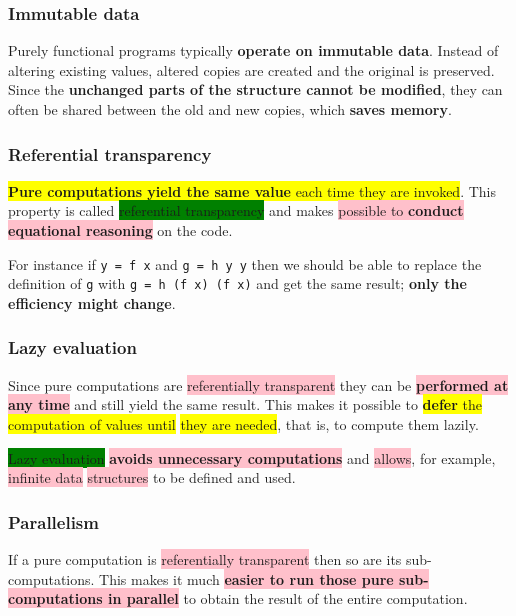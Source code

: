 \documentclass[tikz,border=10pt]{project_plan}
\begin{document}
\subsubsection{Immutable data}

Purely functional programs typically \textbf{operate on immutable data}. Instead
of altering existing values, altered copies are created and the original is
preserved. Since the \textbf{unchanged parts of the structure cannot be modified},
they can often be shared between the old and new copies, which \textbf{saves memory}.

\subsubsection{Referential transparency}

\colorbox{yellow}{\textbf{Pure computations yield the same value} each time they are invoked}. This
property is called \colorbox{green}{referential transparency} and makes \colorbox{pink}{possible to
  \textbf{conduct equational reasoning}} on the code.

For instance if \lstinline[]|y = f x| and \lstinline[]|g = h y y| then we should be able to replace the
definition of \lstinline[]|g| with \lstinline[]|g = h (f x) (f x)| and get the same result;
\textbf{only the efficiency might change}.

\subsubsection{Lazy evaluation}

Since pure computations are \colorbox{pink}{referentially transparent} they can be \colorbox{pink}{\textbf{performed at any time}}
and still yield the same result. This makes it possible to \colorbox{yellow}{\textbf{defer} the
  computation of values until} \colorbox{yellow}{they are needed}, that is, to compute them lazily.

\colorbox{green}{Lazy evaluation} \colorbox{pink}{\textbf{avoids unnecessary computations}} and \colorbox{pink}{allows}, for example,
\colorbox{pink}{infinite data} \colorbox{pink}{structures} to be defined and used.

\subsubsection{Parallelism}

If a pure computation is \colorbox{pink}{referentially transparent} then so are its sub-computations.
This makes it much \colorbox{pink}{\textbf{easier to run those pure sub-computations in parallel}}
to obtain the result of the entire computation.
\end{document}
